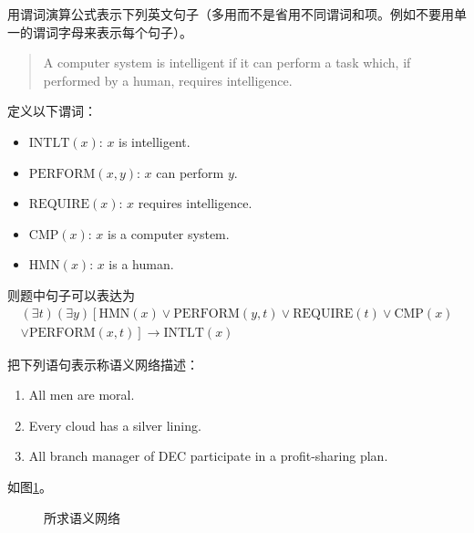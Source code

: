 \begin{question}
用谓词演算公式表示下列英文句子（多用而不是省用不同谓词和项。例如不要用单一的谓词字母来表示每个句子）。
	\begin{quote}
		A computer system is intelligent if it can perform a task which, if performed by a human, requires intelligence. 
	\end{quote}
\end{question}
\begin{solution}
定义以下谓词：
	\begin{itemize}
		\item $\mathrm{INTLT}(x)$:	$x$ is intelligent.
		\item $\mathrm{PERFORM}(x,y)$:	$x$ can perform $y$.
		\item $\mathrm{REQUIRE}(x)$:		$x$ requires intelligence.
		\item $\mathrm{CMP}(x)$:		$x$ is a computer system.
		\item $\mathrm{HMN}(x)$:		$x$ is a human.
	\end{itemize} \par
则题中句子可以表达为
	\begin{multline*}
	\left( \exists t \right) \left( \exists y \right)
	\left[ \mathrm{HMN}(x) \vee \mathrm{PERFORM}(y,t) \vee \mathrm{REQUIRE}(t)
	\vee \mathrm{CMP}(x) \right. \\
	\left. \vee \mathrm{PERFORM}(x,t) \right] 
	\to \mathrm{INTLT}(x)
	\end{multline*}
\end{solution}

\begin{question}
把下列语句表示称语义网络描述：
	\begin{enumerate}
		\item All men are moral.
		\item Every cloud has a silver lining.
		\item All branch manager of DEC participate in a profit-sharing plan. 
	\end{enumerate}
\end{question}
\begin{solution}
如图\ref{Fig:semantic-net}。
	\begin{figure} [h]
		\centering
		\captionsetup{justification=centering}
		\vfill
		\vfill
	    \caption{ 所求语义网络 } \label{Fig:semantic-net}
	\end{figure}
\end{solution}

